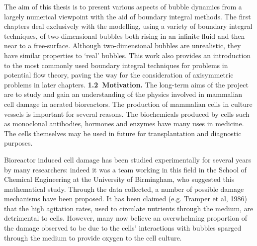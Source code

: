 The aim of this thesis is to present various aspects of
bubble dynamics from a largely numerical viewpoint with the
aid of boundary integral methods. 
The first chapters deal exclusively with the
modelling, using a variety of boundary
integral techniques, of two-dimensional bubbles
both rising in an infinite fluid and then near to a free-surface. 
Although two-dimensional bubbles are unrealistic,
they have similar properties to `real' bubbles. This
work also provides an introduction to the most commonly used 
boundary integral techniques for problems in potential flow theory,
paving the way for the consideration of axisymmetric problems
in later chapters.
\vskip 15pt
\hbox{\bf 1.2 Motivation.}
\vskip 5pt
The long-term aims of the project are to study and gain an
understanding
of the physics involved in mammalian cell damage in aerated 
bioreactors. 
The production of mammalian cells in culture vessels is important 
for several reasons. The biochemicals produced by cells such as 
monoclonal antibodies, hormones and enzymes have many uses in medicine.
The cells themselves may be used in future for transplantation
and diagnostic purposes.

Bioreactor induced cell damage has been studied experimentally 
for several years by many researchers: 
indeed it was a team working in this field in the School
of Chemical Engineering at the University of Birmingham,
who suggested this mathematical study. Through the data collected,
a number of possible damage mechanisms have 
been proposed. It has been claimed
(e.g. Tramper et al, 1986) that the high agitation rates,  
used to circulate nutrients through the
medium, are detrimental to cells. 
However, many now believe an overwhelming proportion of
the damage observed to be
due to the cells' interactions with bubbles sparged
through the medium to provide oxygen to the cell culture.

